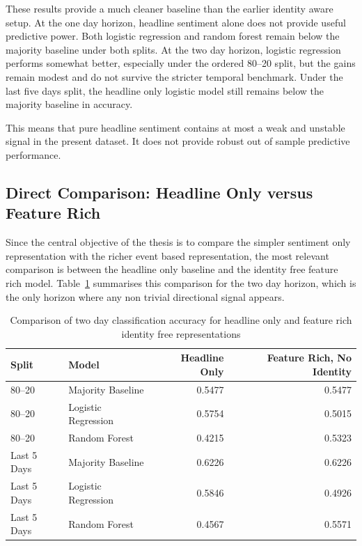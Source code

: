 These results provide a much cleaner baseline than the earlier identity aware setup. At the one day horizon, headline sentiment alone does not provide useful predictive power. Both logistic regression and random forest remain below the majority baseline under both splits. At the two day horizon, logistic regression performs somewhat better, especially under the ordered 80--20 split, but the gains remain modest and do not survive the stricter temporal benchmark. Under the last five days split, the headline only logistic model still remains below the majority baseline in accuracy.

This means that pure headline sentiment contains at most a weak and unstable signal in the present dataset. It does not provide robust out of sample predictive performance.

\subsection{Direct Comparison: Headline Only versus Feature Rich}

Since the central objective of the thesis is to compare the simpler sentiment only representation with the richer event based representation, the most relevant comparison is between the headline only baseline and the identity free feature rich model. Table~\ref{tab:headline_vs_feature_rich} summarises this comparison for the two day horizon, which is the only horizon where any non trivial directional signal appears.

\begin{table}[htbp]
\centering
\caption{Comparison of two day classification accuracy for headline only and feature rich identity free representations}
\label{tab:headline_vs_feature_rich}
\begin{tabular}{llrr}
\hline
\textbf{Split} & \textbf{Model} & \textbf{Headline Only} & \textbf{Feature Rich, No Identity} \\
\hline
80--20 & Majority Baseline & 0.5477 & 0.5477 \\
80--20 & Logistic Regression & 0.5754 & 0.5015 \\
80--20 & Random Forest & 0.4215 & 0.5323 \\
\hline
Last 5 Days & Majority Baseline & 0.6226 & 0.6226 \\
Last 5 Days & Logistic Regression & 0.5846 & 0.4926 \\
Last 5 Days & Random Forest & 0.4567 & 0.5571 \\
\hline
\end{tabular}
\end{table}

